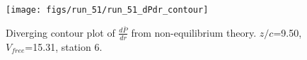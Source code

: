 \begin{figure}[H]
\centering
\texttt{[image: figs/run\_51/run\_51\_dPdr\_contour]}
\caption{Diverging contour plot of $\frac{d\bar{P}}{dr}$ from non-equilibrium theory. $z/c$=9.50, $V_{free}$=15.31, station 6.}
\label{fig:run_51_dPdr_contour}
\end{figure}


